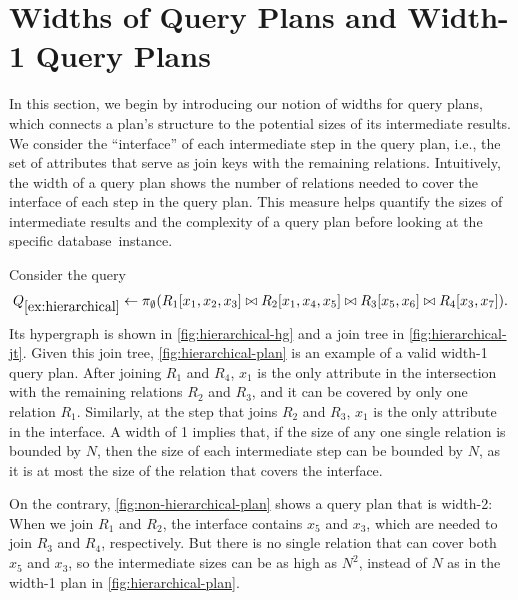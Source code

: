 \section{Widths of Query Plans and Width-1 Query Plans}
\label{sec:hierarchical-query-plan}

In this section, we begin by introducing our notion of widths for query plans, which connects a plan's structure to the potential sizes of its intermediate results.  
We consider the ``interface'' of each intermediate step in the query plan, i.e., the set of attributes that serve as join keys with the remaining relations.
Intuitively, the width of a query plan shows the number of relations needed to cover the interface of each step in the query plan.
This measure helps quantify the sizes of intermediate results and the complexity of a query plan before looking at the specific database~instance.  

\begin{example} \label{ex:hierarchical}
    Consider the query 
    \[Q_{\ref{ex:hierarchical}} \gets \pi_\emptyset(R_1[x_1, x_2, x_3] \bowtie R_2[x_1, x_4, x_5] \bowtie R_3[x_5, x_6] \bowtie R_4[x_3, x_7]). \]
    Its hypergraph is shown in \cref{fig:hierarchical-hg} and a join tree in \cref{fig:hierarchical-jt}.
    Given this join tree, \cref{fig:hierarchical-plan} is an example of a valid width-1 query plan.
    After joining $R_1$ and $R_4$, $x_1$ is the only attribute in the intersection with the remaining relations $R_2$ and $R_3$, and it can be covered by only one relation $R_1$.
    Similarly, at the step that joins $R_2$ and $R_3$, $x_1$ is the only attribute in the interface.
    A width of 1 implies that, if the size of any one single relation is bounded by $N$, then the size of each intermediate step can be bounded by $N$, as it is at most the size of the relation that covers the interface.
    
    On the contrary, \cref{fig:non-hierarchical-plan} shows a query plan that is width-2: When we join $R_1$ and $R_2$, the interface contains $x_5$ and $x_3$, which are needed to join $R_3$ and $R_4$, respectively.
    But there is no single relation that can cover both $x_5$ and $x_3$, so the intermediate sizes can be as high as $N^2$, instead of $N$ as in the width-1 plan in \cref{fig:hierarchical-plan}.
\end{example}


